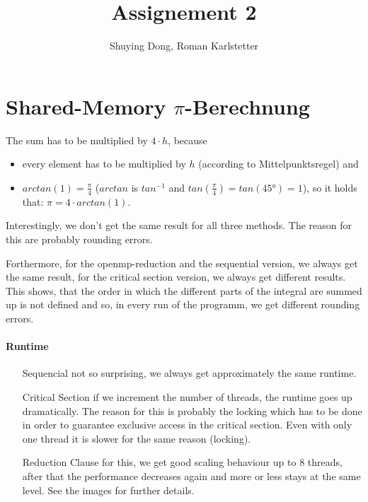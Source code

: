 \documentclass[a4paper,10pt]{article}
\title{Assignement 2}
\author{Shuying Dong, Roman Karlstetter}
\begin{document}
\section{Shared-Memory $\pi$-Berechnung}
The sum has to be multiplied by $4\cdot h$, because
\begin{itemize}
 \item every element has to be multiplied by $h$ (according to Mittelpunktsregel) and
 \item $arctan(1) = \frac{\pi}{4}$ ($arctan$ is $tan^{-1}$ and $tan(\frac{\pi}{4}) = tan(45°) = 1$), so it holds that: $\pi = 4 \cdot arctan(1)$. 
\end{itemize}

Interestingly, we don't get the same result for all three methods. The reason for this are probably rounding errors. 

Forthermore, for the openmp-reduction and the sequential version, we always get the same result, for the critical section version, we always get different results. This shows, that the order in which the different parts of the integral are summed up is not defined and so, in every run of the programm, we get different rounding errors.

\paragraph{Runtime}
\begin{itemize}
 \item[Sequencial] not so surprising, we always get approximately the same runtime.
 \item[Critical Section] if we increment the number of threads, the runtime goes up dramatically. The reason for this is probably the locking which has to be done in order to guarantee exclusive access in the critical section. Even with only one thread it is slower for the same reason (locking).
 \item[Reduction Clause] for this, we get good scaling behaviour up to 8 threads, after that the performance decreases again and more or less stays at the same level. See the images for further details.
\end{itemize}
\end{document}
